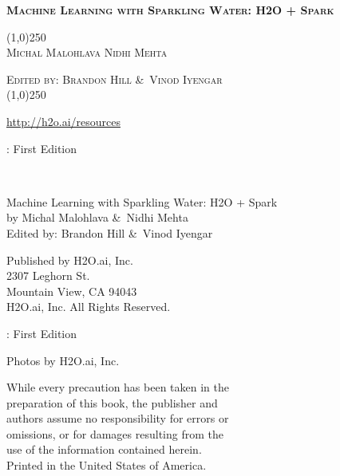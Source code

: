 


%
%
\usepackage{tabularx}
\usepackage{booktabs}
\usepackage{forest}



\thispagestyle{empty} %

\begin{center}
\textsc{\large\bf{Machine Learning with Sparkling Water: H2O + Spark}}

\bigskip
\line(1,0){250}  %
\\
\bigskip
\textsc{\small{Michal Malohlava\hspace{20pt} Nidhi Mehta}}

\textsc{\small{Edited by: Brandon Hill \&\ Vinod Iyengar}}
\\
\bigskip
\line(1,0){250}  %


{\url{http://h2o.ai/resources}}

\bigskip
\monthname \hspace{1pt}  \the\year: First Edition 
\\%
\bigskip
\end{center}

\newpage
\null\vfill %

\thispagestyle{empty}%


{\raggedright\vfill\ 

Machine Learning with Sparkling Water: H2O + Spark\\
  by Michal Malohlava \&\ Nidhi Mehta\\
  Edited by: Brandon Hill \&\ Vinod Iyengar
  
\bigskip
  Published by H2O.ai, Inc. \\
2307 Leghorn St. \\
Mountain View, CA 94043\\
\bigskip
\textcopyright \hspace{1pt} \the\year H2O.ai, Inc. All Rights Reserved. 
\bigskip

\monthname \hspace{1pt}  \the\year: First Edition
\bigskip

Photos by \textcopyright H2O.ai, Inc. 
\bigskip

While every precaution has been taken in the\\
preparation of this book, the publisher and\\
authors assume no responsibility for errors or\\
omissions, or for damages resulting from the\\
use of the information contained herein.\\
\bigskip
Printed in the United States of America. 


}\par

